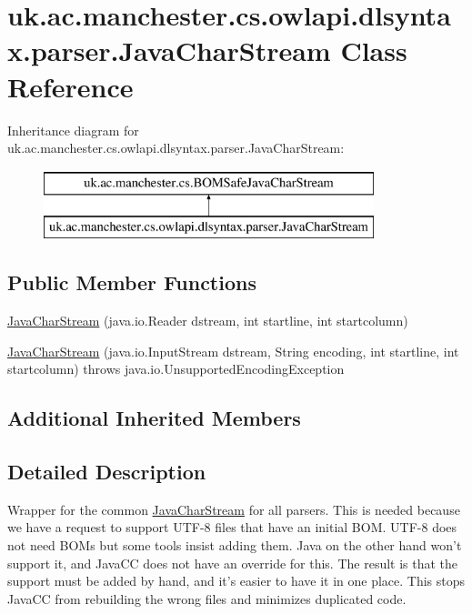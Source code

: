 \hypertarget{classuk_1_1ac_1_1manchester_1_1cs_1_1owlapi_1_1dlsyntax_1_1parser_1_1_java_char_stream}{\section{uk.\-ac.\-manchester.\-cs.\-owlapi.\-dlsyntax.\-parser.\-Java\-Char\-Stream Class Reference}
\label{classuk_1_1ac_1_1manchester_1_1cs_1_1owlapi_1_1dlsyntax_1_1parser_1_1_java_char_stream}
}
Inheritance diagram for uk.\-ac.\-manchester.\-cs.\-owlapi.\-dlsyntax.\-parser.\-Java\-Char\-Stream\-:\begin{figure}[H]
\begin{center}
\leavevmode
\includegraphics[height=2.000000cm]{classuk_1_1ac_1_1manchester_1_1cs_1_1owlapi_1_1dlsyntax_1_1parser_1_1_java_char_stream}
\end{center}
\end{figure}
\subsection*{Public Member Functions}
\begin{DoxyCompactItemize}
\item 
\hyperlink{classuk_1_1ac_1_1manchester_1_1cs_1_1owlapi_1_1dlsyntax_1_1parser_1_1_java_char_stream_ad5e1377b0bd9d5f9dfd183aa258fcc75}{Java\-Char\-Stream} (java.\-io.\-Reader dstream, int startline, int startcolumn)
\item 
\hyperlink{classuk_1_1ac_1_1manchester_1_1cs_1_1owlapi_1_1dlsyntax_1_1parser_1_1_java_char_stream_a4a0b60040e82a0e582d6e44837547250}{Java\-Char\-Stream} (java.\-io.\-Input\-Stream dstream, String encoding, int startline, int startcolumn)  throws java.\-io.\-Unsupported\-Encoding\-Exception 
\end{DoxyCompactItemize}
\subsection*{Additional Inherited Members}


\subsection{Detailed Description}
Wrapper for the common \hyperlink{classuk_1_1ac_1_1manchester_1_1cs_1_1owlapi_1_1dlsyntax_1_1parser_1_1_java_char_stream}{Java\-Char\-Stream} for all parsers. This is needed because we have a request to support U\-T\-F-\/8 files that have an initial B\-O\-M. U\-T\-F-\/8 does not need B\-O\-Ms but some tools insist adding them. Java on the other hand won't support it, and Java\-C\-C does not have an override for this. The result is that the support must be added by hand, and it's easier to have it in one place. This stops Java\-C\-C from rebuilding the wrong files and minimizes duplicated code. 

